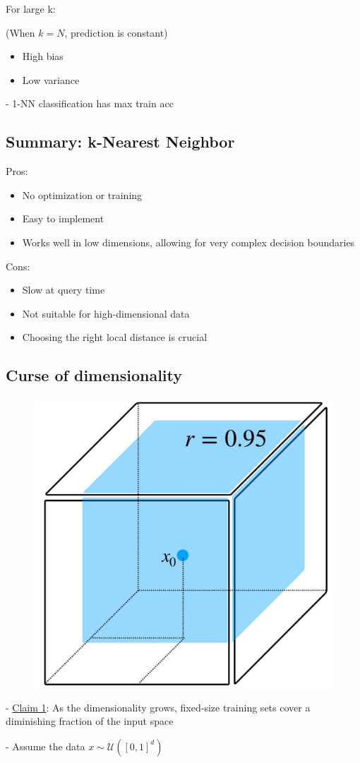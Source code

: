 For large k:

(When $k=N$, prediction is constant)

\begin{itemize}
  \item High bias
  \item Low variance
\end{itemize}


- 1-NN classification has max train acc


\subsection*{Summary: k-Nearest Neighbor}
Pros:
\begin{itemize}
  \item No optimization or training
  \item Easy to implement
  \item Works well in low dimensions, allowing for very complex decision boundaries
\end{itemize}

Cons:
\begin{itemize}
  \item Slow at query time
  \item Not suitable for high-dimensional data
  \item Choosing the right local distance is crucial
\end{itemize}


\subsection*{Curse of dimensionality}

\begin{figure} 
    \centering
    \includegraphics[width=0.2\columnwidth]{figures/dim_r=0_95.jpg}
\end{figure}

- \underline{Claim 1}: As the dimensionality grows, fixed-size training sets cover a diminishing fraction of the input space

- Assume the data $x \sim \mathcal{U}\left([0,1]^{d}\right)$

